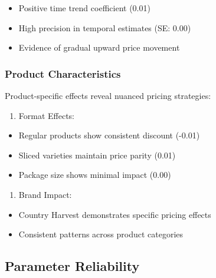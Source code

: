 \documentclass[
  letterpaper,
  DIV=11,
  numbers=noendperiod]{scrartcl}
\providecommand{\tightlist}{%
  \setlength{\itemsep}{0pt}\setlength{\parskip}{0pt}}\usepackage{longtable,booktabs,array}
\begin{document}
\begin{itemize}
\tightlist
\item
  Positive time trend coefficient (0.01)
\item
  High precision in temporal estimates (SE: 0.00)
\item
  Evidence of gradual upward price movement
\end{itemize}

\subsubsection{Product Characteristics}\label{product-characteristics}

Product-specific effects reveal nuanced pricing strategies:

\begin{enumerate}
\def\labelenumi{\arabic{enumi}.}
\tightlist
\item
  Format Effects:
\end{enumerate}

\begin{itemize}
\tightlist
\item
  Regular products show consistent discount (-0.01)
\item
  Sliced varieties maintain price parity (0.01)
\item
  Package size shows minimal impact (0.00)
\end{itemize}

\begin{enumerate}
\def\labelenumi{\arabic{enumi}.}
\setcounter{enumi}{1}
\tightlist
\item
  Brand Impact:
\end{enumerate}

\begin{itemize}
\tightlist
\item
  Country Harvest demonstrates specific pricing effects
\item
  Consistent patterns across product categories
\end{itemize}

\subsection{Parameter Reliability}\label{parameter-reliability}
\end{document}
